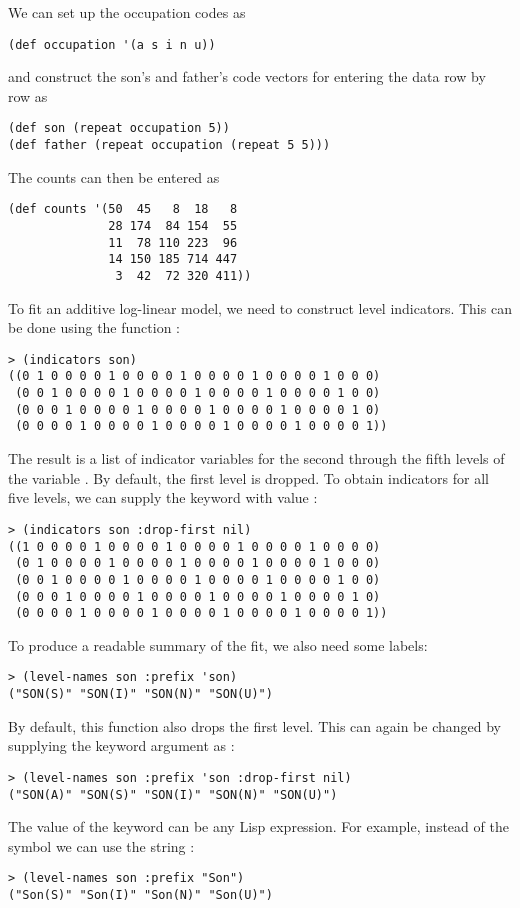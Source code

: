 We can set up the occupation codes as
\begin{verbatim}
(def occupation '(a s i n u))
\end{verbatim}
and construct the son's and father's code vectors for entering the
data row by row as
\begin{verbatim}
(def son (repeat occupation 5))
(def father (repeat occupation (repeat 5 5)))
\end{verbatim}
The counts can then be entered as
\begin{verbatim}
(def counts '(50  45   8  18   8 
              28 174  84 154  55 
              11  78 110 223  96
              14 150 185 714 447
               3  42  72 320 411))
\end{verbatim}

To fit an additive log-linear model, we need to construct level
indicators.  This can be done using the function :
\begin{verbatim}
> (indicators son)
((0 1 0 0 0 0 1 0 0 0 0 1 0 0 0 0 1 0 0 0 0 1 0 0 0)
 (0 0 1 0 0 0 0 1 0 0 0 0 1 0 0 0 0 1 0 0 0 0 1 0 0)
 (0 0 0 1 0 0 0 0 1 0 0 0 0 1 0 0 0 0 1 0 0 0 0 1 0)
 (0 0 0 0 1 0 0 0 0 1 0 0 0 0 1 0 0 0 0 1 0 0 0 0 1))
\end{verbatim}
The result is a list of indicator variables for the second through the fifth
levels of the variable . By default, the first level is dropped.
To obtain indicators for all five levels, we can supply the 
keyword with value :
\begin{verbatim}
> (indicators son :drop-first nil)
((1 0 0 0 0 1 0 0 0 0 1 0 0 0 0 1 0 0 0 0 1 0 0 0 0)
 (0 1 0 0 0 0 1 0 0 0 0 1 0 0 0 0 1 0 0 0 0 1 0 0 0)
 (0 0 1 0 0 0 0 1 0 0 0 0 1 0 0 0 0 1 0 0 0 0 1 0 0)
 (0 0 0 1 0 0 0 0 1 0 0 0 0 1 0 0 0 0 1 0 0 0 0 1 0)
 (0 0 0 0 1 0 0 0 0 1 0 0 0 0 1 0 0 0 0 1 0 0 0 0 1))
\end{verbatim}

To produce a readable summary of the fit, we also need some labels:
\begin{verbatim}
> (level-names son :prefix 'son)
("SON(S)" "SON(I)" "SON(N)" "SON(U)")
\end{verbatim}
By default, this function also drops the first level. This can again be
changed by supplying the  keyword argument as
:
\begin{verbatim}
> (level-names son :prefix 'son :drop-first nil)
("SON(A)" "SON(S)" "SON(I)" "SON(N)" "SON(U)")
\end{verbatim}
The value of the  keyword can be any Lisp expression.
For example, instead of the symbol  we can use the string
:
\begin{verbatim}
> (level-names son :prefix "Son")
("Son(S)" "Son(I)" "Son(N)" "Son(U)")
\end{verbatim}

